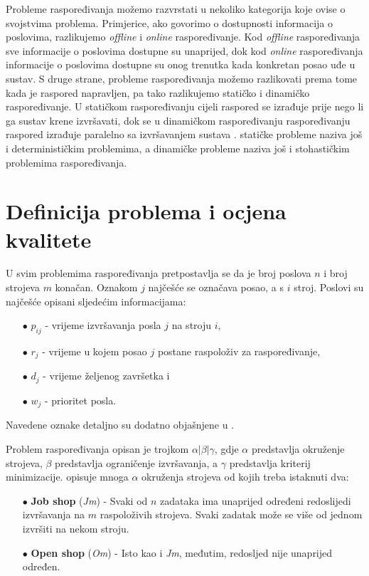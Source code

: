 \documentclass[times, utf8, seminar]{fer}
\begin{document}
Probleme raspoređivanja možemo razvrstati u nekoliko kategorija koje ovise
o svojstvima problema. Primjerice, ako govorimo o dostupnosti informacija o
poslovima,
razlikujemo \emph{offline} i \emph{online} raspoređivanje. Kod \emph{offline}
raspoređivanja sve informacije o poslovima dostupne su unaprijed, dok kod
\emph{online} raspoređivanja informacije o poslovima dostupne su onog
trenutka kada konkretan posao uđe u sustav. S druge strane, probleme
raspoređivanja možemo razlikovati prema tome kada je raspored napravljen, pa
tako razlikujemo statičko i dinamičko raspoređivanje. U statičkom
raspoređivanju cijeli raspored se izrađuje prije nego li ga sustav krene
izvršavati, dok se u dinamičkom raspoređivanju raspoređivanju raspored
izrađuje paralelno sa izvršavanjem sustava \citep{djurasevic2016comparison}.
\citep{michael2018scheduling} statičke probleme naziva još i determinističkim problemima,
a dinamičke probleme naziva još i stohastičkim problemima raspoređivanja.

\section{Definicija problema i ocjena kvalitete}
U svim problemima raspoređivanja pretpostavlja se da je
broj poslova $n$ i broj strojeva $m$ konačan. Oznakom $j$ najčešće se
označava posao, a s $i$ stroj. Poslovi su najčešće opisani sljedećim
informacijama:
\begin{itemize}
    \item[$\bullet$] $p_{ij}$ - vrijeme izvršavanja posla $j$ na stroju $i$,
    \item[$\bullet$] $r_{j}$ - vrijeme u kojem posao $j$ postane raspoloživ za raspoređivanje,
    \item[$\bullet$] $d_j$ - vrijeme željenog završetka i
    \item[$\bullet$] $w_j$ - prioritet posla.
\end{itemize}
Navedene oznake detaljno su dodatno objašnjene u \citep{michael2018scheduling, Durasevic}.

Problem raspoređivanja opisan je trojkom $\alpha | \beta | \gamma$, gdje
$\alpha$ predstavlja okruženje strojeva, $\beta$ predstavlja ograničenje
izvršavanja, a $\gamma$ predstavlja kriterij minimizacije.
\citep{michael2018scheduling} opisuje mnoga $\alpha$ okruženja strojeva od kojih
treba istaknuti dva:
\begin{itemize}
    \item[$\bullet$] \textbf{Job shop} (\textit{Jm}) - Svaki od
    $n$ zadataka ima unaprijed određeni redoslijedi izvršavanja na
    $m$ raspoloživih strojeva. Svaki zadatak može se više od jednom
    izvršiti na nekom stroju.
    \item[$\bullet$] \textbf{Open shop} (\textit{Om}) - Isto kao i
    \textit{Jm}, međutim, redosljed nije unaprijed određen.
\end{itemize}
\end{document}
